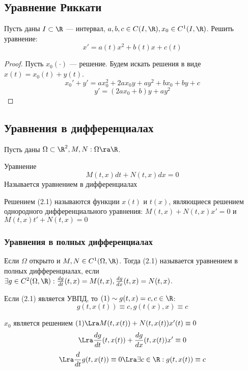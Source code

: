\subsection{Уравнение Риккати}
\begin{problem}
    Пусть даны \(I \subset \R\) --- интервал, \(a, b, c \in C(I, \R), x_0 \in C^1(I, \R)\). Решить уравнение:
    \[x' = a(t)x^2 + b(t)x + c(t)\]
\end{problem}
\begin{proof}
    Пусть \(x_0(\cdot)\) --- решение. Будем искать решения в виде \(x(t) = x_0(t) + y(t)\). 
    \[x_0' + y' = ax_0^2 + 2ax_0y + ay^2 + bx_0 + by + c\]
    \[y' = (2ax_0 + b)y + ay^2\]
\end{proof}

\subsection{Уравнения в дифференциалах}
Пусть даны \(\Omega \subset \R^2, M, N: \Omega \ra \R\).

\begin{definition}
    Уравнение
    \begin{equation}
        M(t, x)dt + N(t, x)dx = 0
    \end{equation}
    Называется уравнением в дифференциалах
\end{definition}

\begin{definition}
    Решением (2.1) называются функции \(x(t)\) и \(t(x)\), являющиеся решением однородного дифференциального уравнения: \(M(t, x) + N(t, x)x' = 0\) и \(M(t, x)t' + N(t, x) = 0\)
\end{definition}

\subsubsection{Уравнения в полных дифференциалах}
\begin{definition}
    Если \(\Omega\) открыто и \(M, N \in C^1(\Omega, \R)\). Тогда (2.1) называется уравнением в полных дифференциалах, если \(\exists g \in C^2(\Omega, \R): \frac{dg}{dt}(t, x) = M(t, x), \frac{dg}{dx}(t, x) = N(t, x)\).
\end{definition}

Если (2.1) является УВПД, то \((1) \sim g(t, x) = c, c \in \R\):
\[g(t, x(t)) \equiv c, g(t(x), x) \equiv c\]

\(x_0\) является решением \((1) \Lra M(t, x(t)) + N(t, x(t))x'(t) \equiv 0\)
\[\Lra \frac{dg}{dt}(t, x(t)) + \frac{dg}{dx}(t, x(t))x' \equiv 0\]
\[\Lra \frac{d}{dt}g(t, x(t)) \equiv 0 \Lra \exists c \in \R: g(t, x(t)) \equiv c\]

